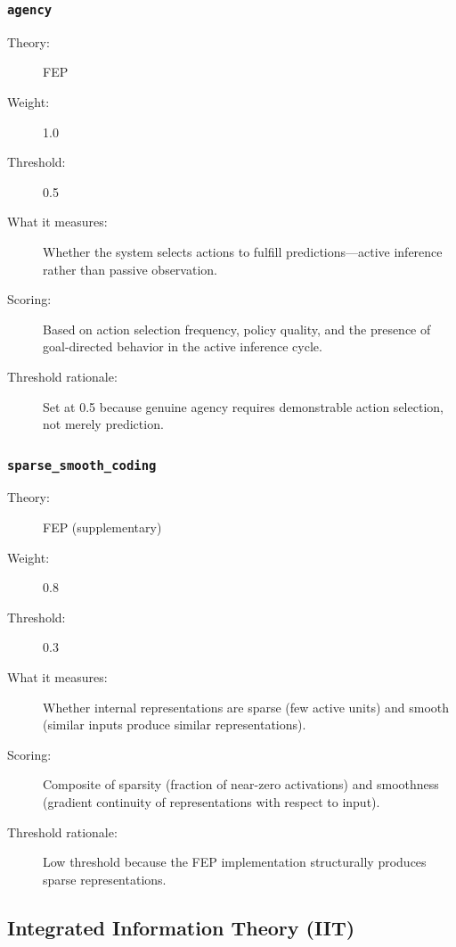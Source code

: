 \subsubsection{\texttt{agency}}
\begin{description}
  \item[Theory:] FEP
  \item[Weight:] 1.0
  \item[Threshold:] 0.5
  \item[What it measures:] Whether the system selects actions to fulfill predictions---active inference rather than passive observation.
  \item[Scoring:] Based on action selection frequency, policy quality, and the presence of goal-directed behavior in the active inference cycle.
  \item[Threshold rationale:] Set at 0.5 because genuine agency requires demonstrable action selection, not merely prediction.
\end{description}

\subsubsection{\texttt{sparse\_smooth\_coding}}
\begin{description}
  \item[Theory:] FEP (supplementary)
  \item[Weight:] 0.8
  \item[Threshold:] 0.3
  \item[What it measures:] Whether internal representations are sparse (few active units) and smooth (similar inputs produce similar representations).
  \item[Scoring:] Composite of sparsity (fraction of near-zero activations) and smoothness (gradient continuity of representations with respect to input).
  \item[Threshold rationale:] Low threshold because the FEP implementation structurally produces sparse representations.
\end{description}

\subsection{Integrated Information Theory (IIT)}

